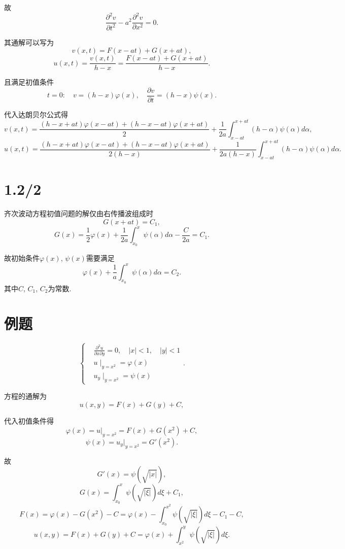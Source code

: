 \documentclass[11pt,a4paper]{article}
\begin{document}
故
$$\frac{\partial^2 v}{\partial t^2}-a^2\frac{\partial^2 v}{\partial x^2}=0.$$

其通解可以写为
$$v(x,t)=F(x-at)+G(x+at),$$
$$u(x,t)=\frac{v(x,t)}{h-x}=\frac{F(x-at)+G(x+at)}{h-x}.$$

且满足初值条件
$$t=0:\quad v=(h-x)\varphi(x),\quad \frac{\partial v}{\partial t}=(h-x)\psi(x).$$

代入达朗贝尔公式得
$$v(x,t)=\frac{(h-x+at)\varphi(x-at)+(h-x-at)\varphi(x+at)}{2}+\frac{1}{2a}\int_{x-at}^{x+at}(h-\alpha)\psi(\alpha)d\alpha,$$
$$u(x,t)=\frac{(h-x+at)\varphi(x-at)+(h-x-at)\varphi(x+at)}{2(h-x)}+\frac{1}{2a(h-x)}\int_{x-at}^{x+at}(h-\alpha)\psi(\alpha)d\alpha.$$

\section{1.2/2}

齐次波动方程初值问题的解仅由右传播波组成时
$$G(x+at)=C_1,$$
$$G(x)=\frac{1}{2}\varphi(x)+\frac{1}{2a}\int_{x_0}^x\psi(\alpha)d\alpha-\frac{C}{2a}=C_1.$$

故初始条件$\varphi(x)$, $\psi(x)$需要满足
$$\varphi(x)+\frac{1}{a}\int_{x_0}^x\psi(\alpha)d\alpha=C_2.$$
其中$C$, $C_1$, $C_2$为常数.

\section*{例题}

$$\left\{\begin{aligned}
     & \frac{\partial^2u}{\partial x\partial y}=0,\quad |x|<1,\quad |y|<1 \\
     & u\mid_{y=x^2}=\varphi(x)                                           \\
     & u_y\mid_{y=x^2}=\psi(x)
  \end{aligned}\right..$$

方程的通解为
$$u(x,y)=F(x)+G(y)+C,$$

代入初值条件得
$$\varphi(x)=u|_{y=x^2}=F(x)+G(x^2)+C,$$
$$\psi(x)=u_y|_{y=x^2}=G'(x^2).$$

故
$$G'(x)=\psi(\sqrt{|x|}),$$
$$G(x)=\int_{x_0}^x\psi(\sqrt{|\xi|})d\xi+C_1,$$
$$F(x)=\varphi(x)-G(x^2)-C=\varphi(x)-\int_{x_0}^{x^2}\psi(\sqrt{|\xi|})d\xi-C_1-C,$$
$$u(x,y)=F(x)+G(y)+C=\varphi(x)+\int_{x^2}^{y}\psi(\sqrt{|\xi|})d\xi.$$
\end{document}
